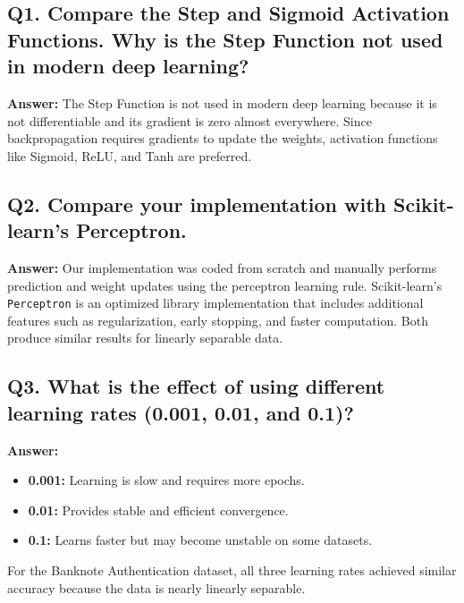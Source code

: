 \documentclass{article}
\begin{document}
\begin{itemize}
\subsection*{Q1. Compare the Step and Sigmoid Activation Functions. Why is the Step Function not used in modern deep learning?}

\textbf{Answer:}
The Step Function is not used in modern deep learning because it is not differentiable and its gradient is zero almost everywhere. Since backpropagation requires gradients to update the weights, activation functions like Sigmoid, ReLU, and Tanh are preferred.

\vspace{4mm}

\subsection*{Q2. Compare your implementation with Scikit-learn's Perceptron.}

\textbf{Answer:}
Our implementation was coded from scratch and manually performs prediction and weight updates using the perceptron learning rule. Scikit-learn's \texttt{Perceptron} is an optimized library implementation that includes additional features such as regularization, early stopping, and faster computation. Both produce similar results for linearly separable data.

\vspace{4mm}

\subsection*{Q3. What is the effect of using different learning rates (0.001, 0.01, and 0.1)?}

\textbf{Answer:}
\begin{itemize}
    \item \textbf{0.001:} Learning is slow and requires more epochs.
    \item \textbf{0.01:} Provides stable and efficient convergence.
    \item \textbf{0.1:} Learns faster but may become unstable on some datasets.
\end{itemize}

For the Banknote Authentication dataset, all three learning rates achieved similar accuracy because the data is nearly linearly separable.

\vspace{4mm}


\end{itemize}
\end{document}
